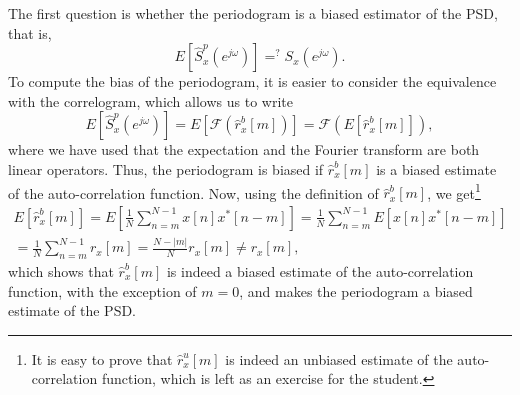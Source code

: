 The first question is whether the periodogram is a biased estimator of the PSD, that is, 
\begin{equation*}
E\left[\hat{S}_x^{p}(e^{j \omega}) \right] \mathop{=}^{?} S_x(e^{j \omega}).
\end{equation*}
To compute the bias of the periodogram, it is easier to consider the equivalence with the correlogram, which allows us to write
\begin{equation*}
E\left[\hat{S}_x^{p}(e^{j \omega}) \right] = E\left[\mathcal{F}(\hat{r}_{x}^{b}[m]) \right] = \mathcal{F}\left(E\left[ \hat{r}_{x}^{b}[m]\right]\right),  
\end{equation*}
where we have used that the expectation and the Fourier transform are both linear operators. Thus, the periodogram is biased if $\hat{r}_{x}^{b}[m]$ is a biased estimate of the auto-correlation function. Now, using the definition of  $\hat{r}_{x}^{b}[m]$, we get\footnote{It is easy to prove that $\hat{r}_{x}^{u}[m]$ is indeed an unbiased estimate of the auto-correlation function, which is left as an exercise for the student.}
\begin{multline*}
E\left[ \hat{r}_{x}^{b}[m]\right] = E\left[ \frac{1}{N} \sum_{n = m}^{N-1} x[n] x^{\ast}[n-m] \right] = \frac{1}{N} \sum_{n = m}^{N-1} E\left[ x[n] x^{\ast}[n-m] \right] \\ = \frac{1}{N} \sum_{n = m}^{N-1} r_{x}[m] = \frac{N - |m|}{N} r_{x}[m] \neq r_{x}[m],
\end{multline*}
which shows that $\hat{r}_{x}^{b}[m]$ is indeed a biased estimate of the auto-correlation function, with the exception of $m = 0$, and makes the periodogram a biased estimate of the PSD.

